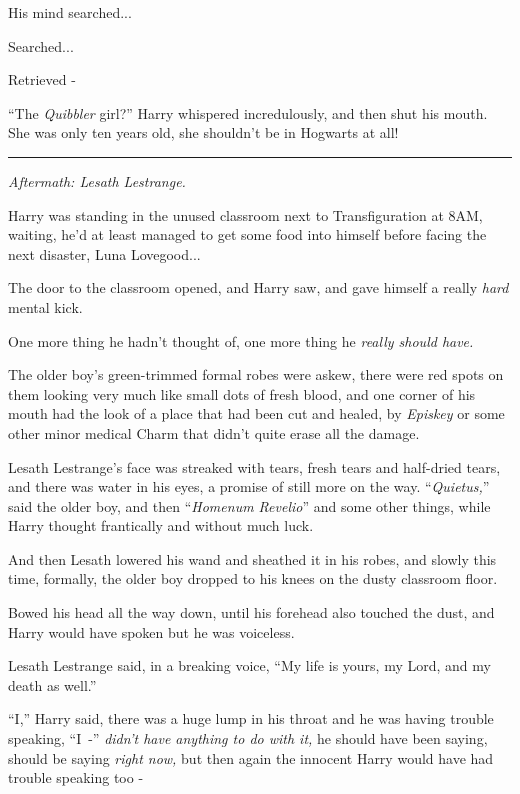 His mind searched...

Searched...

Retrieved -

``The \emph{Quibbler} girl?'' Harry whispered incredulously, and then shut his mouth. She was only ten years old, she shouldn't be in Hogwarts at all!

\begin{center}\rule{3in}{0.4pt}\end{center}

\emph{Aftermath: Lesath Lestrange.}

Harry was standing in the unused classroom next to Transfiguration at 8AM, waiting, he'd at least managed to get some food into himself before facing the next disaster, Luna Lovegood...

The door to the classroom opened, and Harry saw, and gave himself a really \emph{hard} mental kick.

One more thing he hadn't thought of, one more thing he \emph{really should have.}

The older boy's green-trimmed formal robes were askew, there were red spots on them looking very much like small dots of fresh blood, and one corner of his mouth had the look of a place that had been cut and healed, by \emph{Episkey} or some other minor medical Charm that didn't quite erase all the damage.

Lesath Lestrange's face was streaked with tears, fresh tears and half-dried tears, and there was water in his eyes, a promise of still more on the way. ``\emph{Quietus,}'' said the older boy, and then ``\emph{Homenum Revelio}'' and some other things, while Harry thought frantically and without much luck.

And then Lesath lowered his wand and sheathed it in his robes, and slowly this time, formally, the older boy dropped to his knees on the dusty classroom floor.

Bowed his head all the way down, until his forehead also touched the dust, and Harry would have spoken but he was voiceless.

Lesath Lestrange said, in a breaking voice, ``My life is yours, my Lord, and my death as well.''

``I,'' Harry said, there was a huge lump in his throat and he was having trouble speaking, ``I~-'' \emph{didn't have anything to do with it,} he should have been saying, should be saying \emph{right now,} but then again the innocent Harry would have had trouble speaking too -

